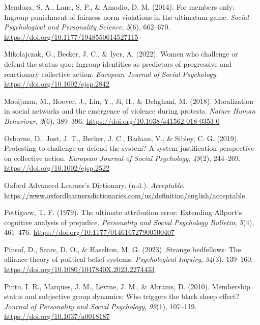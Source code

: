 \documentclass[12pt, letterpaper]{article}
\newenvironment{CSLReferences}[2]{}{}
\begin{document}
\begin{CSLReferences}{1}{0}
\leavevmode{}%
Mendoza, S. A., Lane, S. P., \& Amodio, D. M. (2014). For members only:
Ingroup punishment of fairness norm violations in the ultimatum game.
\emph{Social Psychological and Personality Science}, \emph{5}(6),
662--670. \url{https://doi.org/10.1177/1948550614527115}

\leavevmode{}%
Mikolajczak, G., Becker, J. C., \& Iyer, A. (2022). Women who challenge
or defend the status quo: {Ingroup} identities as predictors of
progressive and reactionary collective action. \emph{European Journal of
Social Psychology}. \url{https://doi.org/10.1002/ejsp.2842}

\leavevmode{}%
Mooijman, M., Hoover, J., Lin, Y., Ji, H., \& Dehghani, M. (2018).
Moralization in social networks and the emergence of violence during
protests. \emph{Nature Human Behaviour}, \emph{2}(6), 389--396.
\url{https://doi.org/10.1038/s41562-018-0353-0}

\leavevmode{}%
Osborne, D., Jost, J. T., Becker, J. C., Badaan, V., \& Sibley, C. G.
(2019). Protesting to challenge or defend the system? {A} system
justification perspective on collective action. \emph{European Journal
of Social Psychology}, \emph{49}(2), 244--269.
\url{https://doi.org/10.1002/ejsp.2522}

\leavevmode{}%
Oxford Advanced Learner's Dictionary. (n.d.). \emph{Acceptable}.
\url{https://www.oxfordlearnersdictionaries.com/us/definition/english/acceptable}

\leavevmode{}%
Pettigrew, T. F. (1979). The ultimate attribution error: Extending
{Allport}'s cognitive analysis of prejudice. \emph{Personality and
Social Psychology Bulletin}, \emph{5}(4), 461--476.
\url{https://doi.org/10.1177/014616727900500407}

\leavevmode{}%
Pinsof, D., Sears, D. O., \& Haselton, M. G. (2023). Strange bedfellows:
The alliance theory of political belief systems. \emph{Psychological
Inquiry}, \emph{34}(3), 139--160.
\url{https://doi.org/10.1080/1047840X.2023.2274433}

\leavevmode{}%
Pinto, I. R., Marques, J. M., Levine, J. M., \& Abrams, D. (2010).
Membership status and subjective group dynamics: Who triggers the black
sheep effect? \emph{Journal of Personality and Social Psychology},
\emph{99}(1), 107--119. \url{https://doi.org/10.1037/a0018187}


\end{CSLReferences}
\end{document}
